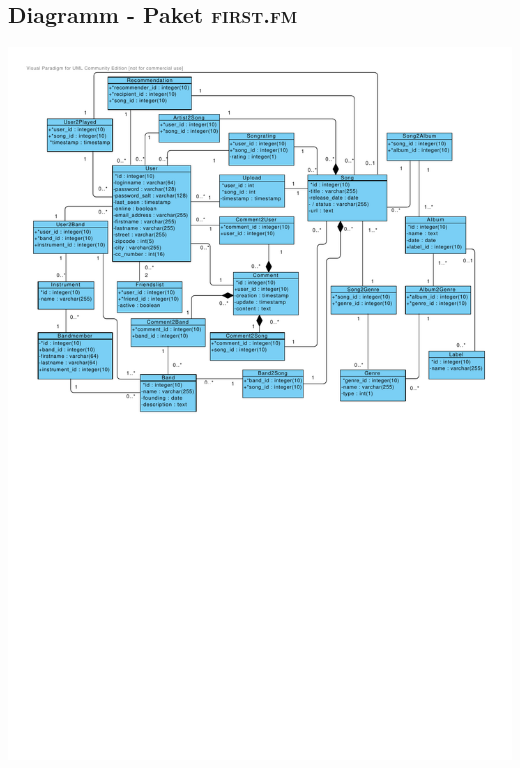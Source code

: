 \documentclass[11pt,a4paper,DIV=9]{scrartcl}
\begin{document}
\subsection{Diagramm - Paket \textsc{first.fm}}
     \includegraphics[angle=90,trim=1cm 0cm 1.1cm 1cm, clip=true, scale=0.98]{Diagramme/Paket_FirstFm}
\end{document}
